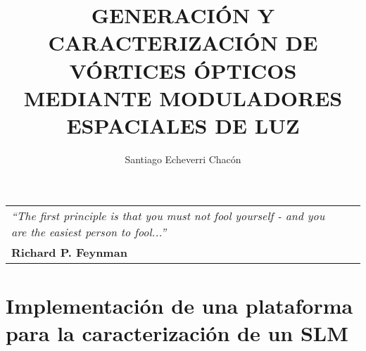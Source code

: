 \documentclass[11pt,spanish, oneside]{SETUP/ezthesis}
\author{Santiago Echeverri Chacón}
\title{GENERACIÓN Y CARACTERIZACIÓN DE VÓRTICES
                  ÓPTICOS MEDIANTE MODULADORES ESPACIALES DE LUZ}
\begin{document}


\frontmatter

\clearpage


\vspace*{5cm}
\begin{flushright}
\begin{tabular}{p{10cm}r}
\emph{``The first principle is that you must not fool yourself - and you are the easiest person to fool...''} \\
\textbf{Richard P. Feynman}
\end{tabular}
\end{flushright}
\thispagestyle{empty}






\setcounter{secnumdepth}{5} %
\setcounter{tocdepth}{5}    %
\tableofcontents
\listoffigures

% 
% 
% 

% 
% 
% 
% 
% 





\printnomenclature %


\label{sec:glossary} %


\mainmatter
\pagestyle{fancy}

	
%	

\part{Implementación de una plataforma para la caracterización de un SLM\label{ParteI}}


\end{document}
